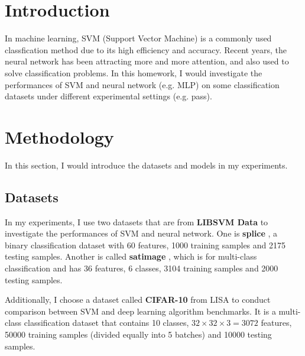 \documentclass[12pt,a4paper]{article}
\theoremstyle{definition}
\begin{document}
\noindent
\noindent{}

\section{Introduction}

In machine learning, SVM (Support Vector Machine) is a commonly used classfication method due to its high efficiency and accuracy. Recent years, the neural network has been attracting more and more attention, and also used to solve classification problems. In this homework, I would investigate the performances of SVM and neural network (e.g. MLP) on some classification datasets under different experimental settings (e.g. pass).

\section{Methodology}

In this section, I would introduce the datasets and models in my experiments.

\subsection{Datasets}

In my experiments, I use two datasets that are from \textbf{LIBSVM Data} \cite{dataA} to investigate the performances of SVM and neural network. One is \textbf{splice} \cite{splice}, a binary classification dataset with 60 features, 1000 training samples and 2175 testing samples. Another is called \textbf{satimage} \cite{satimage}, which is for multi-class classification and has 36 features, 6 classes, 3104 training samples and 2000 testing samples.

Additionally, I choose a dataset called \textbf{CIFAR-10} \cite{cifar-10} from LISA \cite{dataB} to conduct comparison between SVM and deep learning algorithm benchmarks. It is a multi-class classification dataset that contains 10 classes, $32 \times 32 \times 3 = 3072$ features, 50000 training samples (divided equally into 5 batches) and 10000 testing samples.
\end{document}

